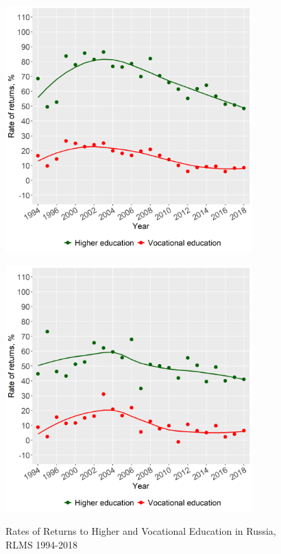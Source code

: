 \documentclass[12pt,a4paper]{article}
\numberwithin{equation}{section}
\begin{document}
\begin{figure}[H]
  \begin{minipage}[b]{.5\linewidth}
     \centering
     \hspace*{-0.7in}
     \includegraphics[width=270pt]{p3a.png}
     \label{fig:3a}
  \end{minipage}
  \hfill
  \begin{minipage}[b]{.5\linewidth}
     \centering
     \hspace*{0in}
     \includegraphics[width=270pt]{p3b.png}
     \label{fig:3b}
  \end{minipage}
  \caption{Rates of Returns to Higher and Vocational Education in Russia, RLMS 1994-2018}\label{fig:4}
\end{figure}
\end{document}
